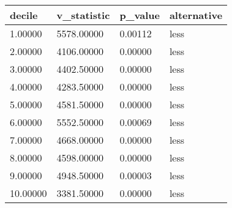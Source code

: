 \begin{table}
\centering
\begin{tabular}[t]{llll}
\toprule
decile & v\_statistic & p\_value & alternative\\
\midrule
1.00000 & 5578.00000 & 0.00112 & less\\
2.00000 & 4106.00000 & 0.00000 & less\\
3.00000 & 4402.50000 & 0.00000 & less\\
4.00000 & 4283.50000 & 0.00000 & less\\
5.00000 & 4581.50000 & 0.00000 & less\\
6.00000 & 5552.50000 & 0.00069 & less\\
7.00000 & 4668.00000 & 0.00000 & less\\
8.00000 & 4598.00000 & 0.00000 & less\\
9.00000 & 4948.50000 & 0.00003 & less\\
10.00000 & 3381.50000 & 0.00000 & less\\
\bottomrule
\end{tabular}
\end{table}
